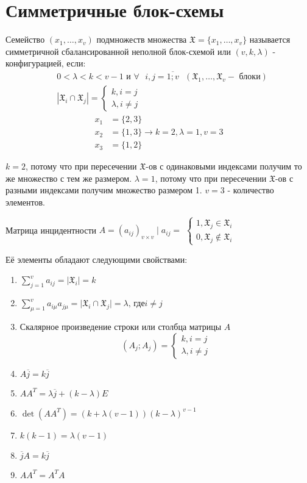 \section{Симметричные блок-схемы}

\opr Семейство $(x_1, \dots, x_v)$ подмножеств множества $\mathfrak{X} = \lbrace x_1, \dots, x_v\rbrace$
называется симметричной сбалансированной неполной блок-схемой или $(v, k , \lambda)$ - конфигурацией, если:
\begin{align*}
	&0 < \lambda < k < v - 1 \text{ и } \forall \text{ } i, j  = \overline{1;v} \text{ } (\mathfrak{X}_1, \dots, \mathfrak{X}_v - \text{ блоки})\\
	&|\mathfrak{X}_i \cap \mathfrak{X}_j| = 
	\begin{cases}
		k, i = j \\
		\lambda, i \neq j
	\end{cases}
\end{align*}
\examplei
\begin{align*}
	x_1 &= \lbrace 2, 3 \rbrace \\
	x_2 &= \lbrace 1, 3 \rbrace \rightarrow k = 2, \lambda = 1, v = 3\\
	x_3 &= \lbrace 1, 2 \rbrace
\end{align*}

\prim $k = 2$, потому что при пересечении $\mathfrak{X}$-ов с одинаковыми индексами получим то же множество с тем же размером.
$\lambda = 1$, потому что при пересечении $\mathfrak{X}$-ов с разными индексами получим множество размером 1.
$v = 3$ - количество элементов.

Матрица инцидентности $A = (a_{ij})_{v \times v} \mid a_{ij} = $
$\begin{cases}
	1, \mathfrak{X}_j \in \mathfrak{X}_i \\
	0, \mathfrak{X}_j \notin \mathfrak{X}_i
\end{cases}$

Её элементы обладают следующими свойствами:
\begin{enumerate}
	\item $\sum_{j=1}^v a_{ij} = \vert \mathfrak{X}_i \vert = k$
	\item $\sum_{\mu=1}^v a_{i\mu}a_{j\mu} = \vert \mathfrak{X}_i \cap \mathfrak{X}_j \vert = \lambda \text{, где} i\neq j$
	\item Скалярное произведение строки или столбца матрицы $A$
	\begin{equation*}
		(A_j; A_j) = 
		\begin{cases}
			k, i = j \\
			\lambda, i \neq j
		\end{cases}
	\end{equation*}
	\item $A\overline{j} = k\overline{j}$
	\item $AA^T = \lambda \overline{j} + (k - \lambda)E$
	\item $\det(AA^T) = (k + \lambda(v - 1))(k - \lambda)^{v - 1}$
	\item $k(k - 1) = \lambda(v - 1)$
	\item $\overline{j}A = k\overline{j}$
	\item $AA^T = A^TA$
\end{enumerate}

